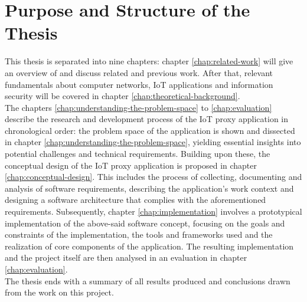 \section{Purpose and Structure of the Thesis}
This thesis is separated into nine chapters: chapter \ref{chap:related-work} will give an overview of and discuss related and previous work. After that, relevant fundamentals about computer networks, \ac{IoT} applications and information security will be covered in chapter \ref{chap:theoretical-background}.\\
The chapters \ref{chap:understanding-the-problem-space} to \ref{chap:evaluation} describe the research and development process of the \ac{IoT} proxy application in chronological order: the problem space of the application is shown and dissected in chapter \ref{chap:understanding-the-problem-space}, yielding essential insights into potential challenges and technical requirements. Building upon these, the conceptual design of the \ac{IoT} proxy application is proposed in chapter \ref{chap:conceptual-design}. This includes the process of collecting, documenting and analysis of software requirements, describing the application's work context and designing a software architecture that complies with the aforementioned requirements. Subsequently, chapter \ref{chap:implementation} involves a prototypical implementation of the above-said software concept, focusing on the goals and constraints of the implementation, the tools and frameworks used and the realization of core components of the application. The resulting implementation and the project itself are then analysed in an evaluation in chapter \ref{chap:evaluation}.\\
The thesis ends with a summary of all results produced and conclusions drawn from the work on this project.